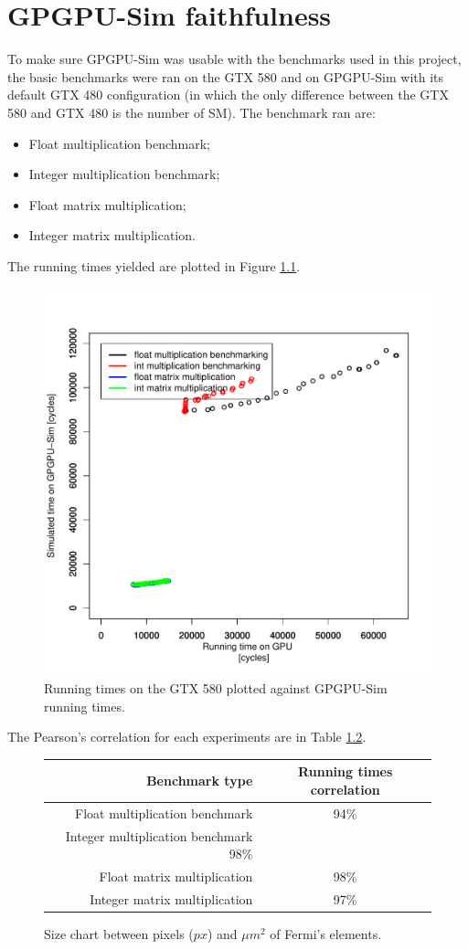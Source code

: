 \documentclass{report}
\begin{document}
\chapter{GPGPU-Sim faithfulness}
    To make sure GPGPU-Sim was usable with the benchmarks used in this project, the basic benchmarks were
    ran on the GTX 580 and on GPGPU-Sim with its default GTX 480 configuration (in which the only difference
    between the GTX 580 and GTX 480 is the number of SM). The benchmark ran are:
    \begin{itemize}
        \item Float multiplication benchmark;
        \item Integer multiplication benchmark;
        \item Float matrix multiplication; 
        \item Integer matrix multiplication.
    \end{itemize}

    The running times yielded are plotted in Figure \ref{fig:gpu-sim-corr}.
    \begin{figure}[H]
    \centering
        \includegraphics[width=0.7\linewidth]{graphics/comparative_graph}
        \captionsetup{justification=centering}
        \caption{Running times on the GTX 580 plotted against GPGPU-Sim running times.}
        \label{fig:gpu-sim-corr}
    \end{figure}

    The Pearson's correlation for each experiments are in Table \ref{tab:gpu-sim-corr}.
    \begin{figure}[H]
    \centering
        \begin{tabular}{ | r | c | }
    	    \hline
    	    Benchmark type & Running times correlation \\ \hline
    	    Float multiplication benchmark & 94\% \\
            Integer multiplication benchmark 98\% \\
            Float matrix multiplication & 98\% \\
            Integer matrix multiplication & 97\% \\ \hline
  	    \end{tabular}
  	\captionsetup{justification=centering}
  	\caption{Size chart between pixels ($px$) and $\mu m^2$ of Fermi's elements.}
  	\label{tab:gpu-sim-corr}
    \end{figure}
\end{document}
